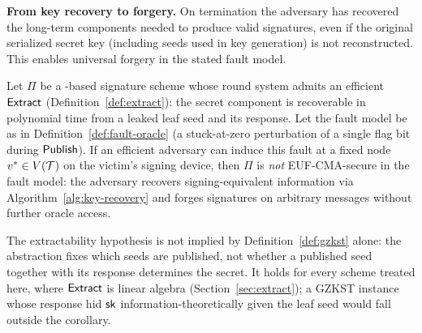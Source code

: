\noindent\textbf{From key recovery to forgery.}
On termination the adversary has recovered the long-term components
needed to produce valid signatures, even if the original serialized secret
key (including seeds used in key generation) is not reconstructed.
This enables universal forgery in the stated fault model.

\begin{corollary}
\label{cor:euf-cma}
Let $\Pi$ be a \GZKST-based signature scheme whose round system admits an
efficient $\mathsf{Extract}$ (Definition~\ref{def:extract}): the secret component is
recoverable in polynomial time from a leaked leaf seed and its response. Let
the fault model be as in
Definition~\ref{def:fault-oracle} (a stuck-at-zero perturbation of a single
flag bit during $\mathsf{Publish}$).  If an efficient adversary can induce this fault
at a fixed node $v^* \in V(\mathcal{T})$ on the victim's signing device, then
$\Pi$ is \emph{not} \textrm{EUF-CMA}-secure in the fault model: the adversary recovers signing-equivalent information via
Algorithm~\ref{alg:key-recovery} and forges signatures on
arbitrary messages without further oracle access.
\end{corollary}

\noindent The extractability hypothesis is not implied by
Definition~\ref{def:gzkst} alone: the abstraction fixes which seeds are
published, not whether a published seed together with its response determines
the secret. It holds for every scheme treated here, where $\mathsf{Extract}$ is linear
algebra (Section~\ref{sec:extract}); a GZKST instance whose response hid $\mathsf{sk}$
information-theoretically given the leaf seed would fall outside the corollary.
